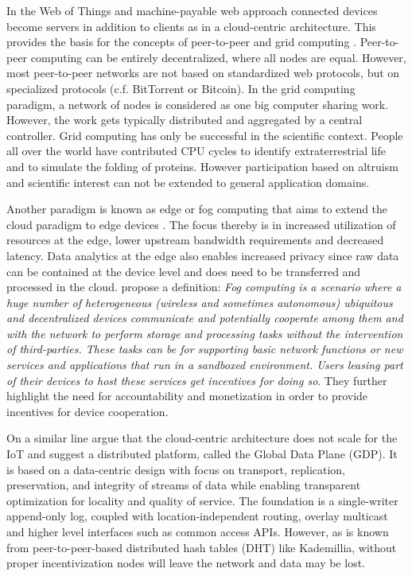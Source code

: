 In the Web of Things and machine-payable web approach connected devices become servers in addition to clients as in a cloud-centric architecture. This provides the basis for the concepts of peer-to-peer \parencite{Rodrigues:2010:PS:1831407.1831427}and grid computing \parencite{Anderson2004boinc}. Peer-to-peer computing can be entirely decentralized, where all nodes are equal. However, most peer-to-peer networks are not based on standardized web protocols, but on specialized protocols (c.f. BitTorrent or Bitcoin). In the grid computing paradigm, a network of nodes is considered as one big computer sharing work. However, the work gets typically distributed and aggregated by a central controller. Grid computing has only be successful in the scientific context. People all over the world have contributed CPU cycles to identify extraterrestrial life and to simulate the folding of proteins. However participation based on altruism and scientific interest can not be extended to general application domains.   

Another paradigm is known as edge or fog computing that aims to extend the cloud paradigm to edge devices \parencite{ISI:000343986300007,Yi:2015:SFC:2757384.2757397}. The focus thereby is in increased utilization of resources at the edge, lower upstream bandwidth requirements and decreased latency. Data analytics at the edge also enables increased privacy since raw data can be contained at the device level and does need to be transferred and processed in the cloud. \cite{ISI:000343986300007} propose a definition: \emph{Fog computing is a scenario where a huge number of heterogeneous (wireless and sometimes autonomous) ubiquitous and decentralized devices communicate and potentially cooperate among them and with the network to perform storage and processing tasks without the intervention of third-parties. These tasks can be for supporting basic network functions or new services and applications that run in a sandboxed environment. Users leasing part of their devices to host these services get incentives for doing so}. They further highlight the need for accountability and monetization in order to provide incentives for device cooperation. 

On a similar line \cite{Zhang:2015} argue that the cloud-centric architecture does not scale for the IoT and suggest a distributed platform, called the Global Data Plane (GDP). It is based on a data-centric design with focus on transport, replication, preservation, and integrity of streams of data while enabling transparent optimization for locality and quality of service. The foundation is a single-writer append-only log, coupled with location-independent routing, overlay multicast and higher level interfaces such as common access APIs. However, as is known from peer-to-peer-based distributed hash tables (DHT) like Kademillia, without proper incentivization nodes will leave the network and data may be lost. 

